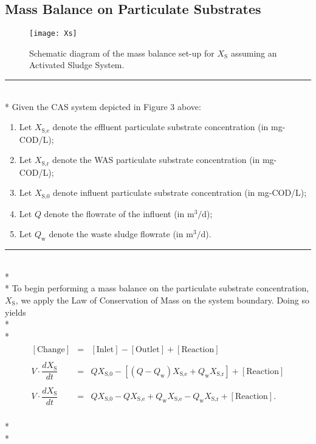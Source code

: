 \documentclass[]{article}
\begin{document}
\subsection{Mass Balance on Particulate Substrates}
\vspace{0.25cm}
\begin{figure}[H]
	\centering
	\texttt{[image: Xs]}
	\caption{Schematic diagram of the mass balance set-up for $X_{\text{S}}$ assuming an Activated Sludge System.}
\end{figure} 
\par\noindent\rule{\textwidth}{0.4pt} \vspace{0.1 cm} \\*
Given the CAS system depicted in Figure 3 above: \vspace{0.05 cm} \begin{enumerate}[label=(\roman*)]
	\item Let $X_{\text{S,e}}$ denote the effluent particulate substrate concentration (in mg-COD/L);
	\item Let $X_{\text{S,r}}$ denote the WAS particulate substrate concentration (in mg-COD/L);
	\item Let $X_{\text{S,0}}$ denote influent particulate substrate concentration (in mg-COD/L);
	\item Let $Q$ denote the flowrate of the influent (in $\text{m}^3/\text{d}$);
	\item Let $Q_{\text{w}}$ denote the waste sludge flowrate (in $\text{m}^3/\text{d}$).
\end{enumerate}
\par\noindent\rule{\textwidth}{0.4pt} \\* \\*
\noindent To begin performing a mass balance on the particulate substrate concentration, $X_{\text{S}}$, we apply the Law of Conservation of Mass on the system boundary. Doing so yields \\* \\* 
\begin{align}
\begin{array}{rcl}
[\text{Change}] &=& [\text{Inlet}] - [\text{Outlet}] + [\text{Reaction}] \\ \\
V \cdot \dfrac{dX_{\text{S}}}{dt} &=& QX_{\text{S,0}} - [(Q-Q_{\text{w}})X_{\text{S,e}} + Q_{\text{w}}X_{\text{S,r}}] + [\text{Reaction}] \\ \\
V \cdot \dfrac{dX_{\text{S}}}{dt} &=& QX_{\text{S,0}} - QX_{\text{S,e}} + Q_{\text{w}}X_{\text{S,e}} - Q_{\text{w}}X_{\text{S,r}} + [\text{Reaction}].
\end{array}
\end{align} \\* \\* 
\end{document}
